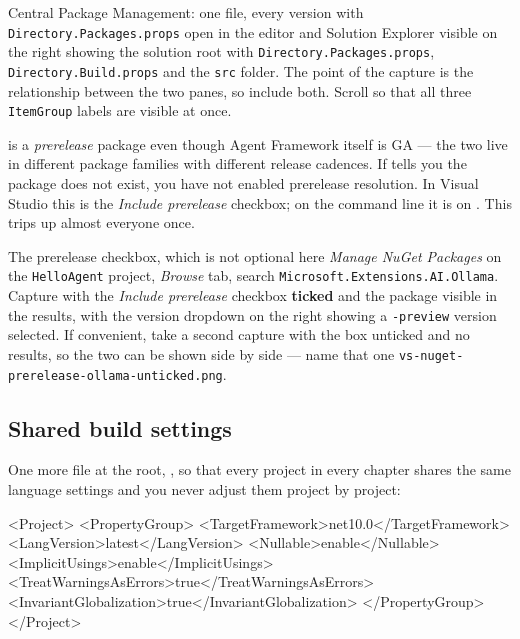 %
{Central Package Management: one file, every version}%
{\vsver{} with \texttt{Directory.Packages.props} open in the editor and Solution
Explorer visible on the right showing the solution root with
\texttt{Directory.Packages.props}, \texttt{Directory.Build.props} and the
\texttt{src} folder. The point of the capture is the relationship between the two
panes, so include both. Scroll so that all three \texttt{ItemGroup} labels are
visible at once.}

\begin{warning}
 is a \emph{prerelease} package even though
Agent Framework itself is GA --- the two live in different package families with
different release cadences. If  tells you the package does
not exist, you have not enabled prerelease resolution. In Visual Studio this is
the \emph{Include prerelease} checkbox; on the command line it is
 on . This trips up almost
everyone once.
\end{warning}

%
{The prerelease checkbox, which is not optional here}%
{\vsver{} \emph{Manage NuGet Packages} on the \texttt{HelloAgent} project,
\emph{Browse} tab, search \texttt{Microsoft.Extensions.AI.Ollama}. Capture with
the \emph{Include prerelease} checkbox \textbf{ticked} and the package visible in
the results, with the version dropdown on the right showing a \texttt{-preview}
version selected. If convenient, take a second capture with the box unticked and
no results, so the two can be shown side by side --- name that one
\texttt{vs-nuget-prerelease-ollama-unticked.png}.}

\subsection{Shared build settings}

One more file at the root, , so that every project
in every chapter shares the same language settings and you never adjust them
project by project:

\begin{xmlcode}[caption={\code{Directory.Build.props}}, label={lst:buildprops}]
<Project>
  <PropertyGroup>
    <TargetFramework>net10.0</TargetFramework>
    <LangVersion>latest</LangVersion>
    <Nullable>enable</Nullable>
    <ImplicitUsings>enable</ImplicitUsings>
    <TreatWarningsAsErrors>true</TreatWarningsAsErrors>
    <InvariantGlobalization>true</InvariantGlobalization>
  </PropertyGroup>
</Project>
\end{xmlcode}

